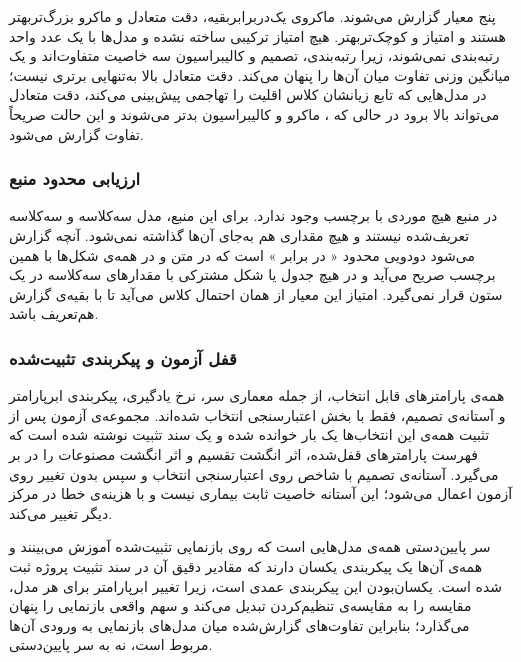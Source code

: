پنج معیار گزارش می‌شوند.  ماکروی یک‌دربرابر‌بقیه، دقت متعادل و  ماکرو بزرگ‌تر‌بهتر هستند و امتیاز  و  کوچک‌تر‌بهتر. هیچ امتیاز ترکیبی ساخته نشده و مدل‌ها با یک عدد واحد رتبه‌بندی نمی‌شوند، زیرا رتبه‌بندی، تصمیم و کالیبراسیون سه خاصیت متفاوت‌اند و یک میانگین وزنی تفاوت میان آن‌ها را پنهان می‌کند. دقت متعادل بالا به‌تنهایی برتری نیست؛ در مدل‌هایی که تابع زیانشان کلاس اقلیت را تهاجمی پیش‌بینی می‌کند، دقت متعادل می‌تواند بالا برود در حالی که ،  ماکرو و کالیبراسیون بدتر می‌شوند و این حالت صریحاً تفاوت گزارش می‌شود.

\subsubsection{ارزیابی محدود منبع }

در منبع  هیچ موردی با برچسب  وجود ندارد. برای این منبع، مدل سه‌کلاسه و  سه‌کلاسه تعریف‌شده نیستند و هیچ مقداری هم به‌جای آن‌ها گذاشته نمی‌شود. آنچه گزارش می‌شود  دودویی محدود « در برابر » است که در متن و در همه‌ی شکل‌ها با همین برچسب صریح می‌آید و در هیچ جدول یا شکل مشترکی با مقدارهای سه‌کلاسه در یک ستون قرار نمی‌گیرد. امتیاز این معیار از همان احتمال کلاس  می‌آید تا با بقیه‌ی گزارش هم‌تعریف باشد.

\subsubsection{قفل آزمون و پیکربندی تثبیت‌شده}

همه‌ی پارامترهای قابل انتخاب، از جمله معماری سر، نرخ یادگیری، پیکربندی ابرپارامتر و آستانه‌ی تصمیم، فقط با بخش اعتبارسنجی انتخاب شده‌اند. مجموعه‌ی آزمون پس از تثبیت همه‌ی این انتخاب‌ها یک بار خوانده شده و یک سند تثبیت نوشته شده است که فهرست پارامترهای قفل‌شده، اثر انگشت تقسیم و اثر انگشت مصنوعات را در بر می‌گیرد. آستانه‌ی تصمیم با شاخص  روی اعتبارسنجی انتخاب و سپس بدون تغییر روی آزمون اعمال می‌شود؛ این آستانه خاصیت ثابت بیماری نیست و با هزینه‌ی خطا در مرکز دیگر تغییر می‌کند.

 سر پایین‌دستی همه‌ی مدل‌هایی است که روی بازنمایی تثبیت‌شده آموزش می‌بینند و همه‌ی آن‌ها یک پیکربندی یکسان دارند که مقادیر دقیق آن در سند تثبیت پروژه ثبت شده است. یکسان‌بودن این پیکربندی عمدی است، زیرا تغییر ابرپارامتر برای هر مدل، مقایسه را به مقایسه‌ی تنظیم‌کردن تبدیل می‌کند و سهم واقعی بازنمایی را پنهان می‌گذارد؛ بنابراین تفاوت‌های گزارش‌شده میان مدل‌های بازنمایی به ورودی آن‌ها مربوط است، نه به سر پایین‌دستی.
